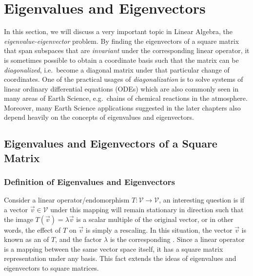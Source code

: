 \chapter{Eigenvalues and Eigenvectors}
\label{chap:eigen}

In this section, we will discuss a very important topic in Linear Algebra, the \textit{eigenvalue-eigenvector} problem. By finding the eigenvectors of a square matrix that span subspaces that are \textit{invariant} under the corresponding linear operator, it is sometimes possible to obtain a coordinate basis such that the matrix can be \textit{diagonalized}, i.e.\ become a diagonal matrix under that particular change of coordinates. One of the practical usages of \textit{diagonalization} is to solve systems of linear ordinary differential equations (ODEs) which are also commonly seen in many areas of Earth Science, e.g.\ chains of chemical reactions in the atmosphere. Moreover, many Earth Science applications suggested in the later chapters also depend heavily on the concepts of eigenvalues and eigenvectors.

\section{Eigenvalues and Eigenvectors of a Square Matrix}
\label{section:eigensection}

\subsection{Definition of Eigenvalues and Eigenvectors}

Consider a linear operator/endomorphism $T: \mathcal{V} \to \mathcal{V}$, an interesting question is if a vector $\vec{v} \in \mathcal{V}$ under this mapping will remain stationary in direction such that the image $T(\vec{v}) = \lambda \vec{v}$ is a scalar multiple of the original vector, or in other words, the effect of $T$ on $\vec{v}$ is simply a rescaling. In this situation, the vector $\vec{v}$ is known as an  of $T$, and the factor $\lambda$ is the corresponding . Since a linear operator is a mapping between the same vector space itself, it has a square matrix representation under any basis. This fact extends the ideas of eigenvalues and eigenvectors to square matrices.

